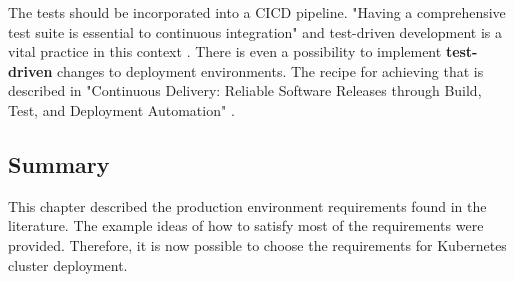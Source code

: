 The tests should be incorporated into a CICD pipeline. "Having a comprehensive test suite is essential to continuous integration" and test-driven development is a vital practice in this context \cite{book-cicd}. There is even a possibility to implement \textbf{test-driven} changes to deployment environments. The recipe for achieving that is described in "Continuous Delivery: Reliable Software Releases through Build, Test, and Deployment Automation" \cite{book-cicd}.


\subsection{Summary}

This chapter described the production environment requirements found in the literature. The example ideas of how to satisfy most of the requirements were provided. Therefore, it is now possible to choose the requirements for Kubernetes cluster deployment.
